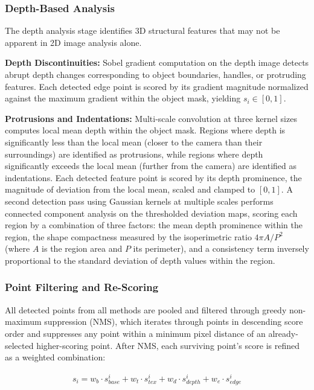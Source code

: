 \subsubsection{Depth-Based Analysis}
\label{subsubsec:depth_analysis}

The depth analysis stage identifies 3D structural features that may not be apparent in 2D image analysis alone.

\textbf{Depth Discontinuities:} Sobel gradient computation on the depth image detects abrupt depth changes corresponding to object boundaries, handles, or protruding features. Each detected edge point is scored by its gradient magnitude normalized against the maximum gradient within the object mask, yielding $s_i \in [0, 1]$.

\textbf{Protrusions and Indentations:} Multi-scale convolution at three kernel sizes computes local mean depth within the object mask. Regions where depth is significantly less than the local mean (closer to the camera than their surroundings) are identified as protrusions, while regions where depth significantly exceeds the local mean (further from the camera) are identified as indentations. Each detected feature point is scored by its depth prominence, the magnitude of deviation from the local mean, scaled and clamped to $[0, 1]$. A second detection pass using Gaussian kernels at multiple scales performs connected component analysis on the thresholded deviation maps, scoring each region by a combination of three factors: the mean depth prominence within the region, the shape compactness measured by the isoperimetric ratio $4\pi A / P^2$ (where $A$ is the region area and $P$ its perimeter), and a consistency term inversely proportional to the standard deviation of depth values within the region.

\subsubsection{Point Filtering and Re-Scoring}
\label{subsubsec:multimodal_fusion}

All detected points from all methods are pooled and filtered through greedy non-maximum suppression (NMS), which iterates through points in descending score order and suppresses any point within a minimum pixel distance of an already-selected higher-scoring point. After NMS, each surviving point's score is refined as a weighted combination:

\begin{align}
    s_i = w_b \cdot s_{base}^i + w_t \cdot s_{tex}^i + w_d \cdot s_{depth}^i + w_e \cdot s_{edge}^i
\end{align}

